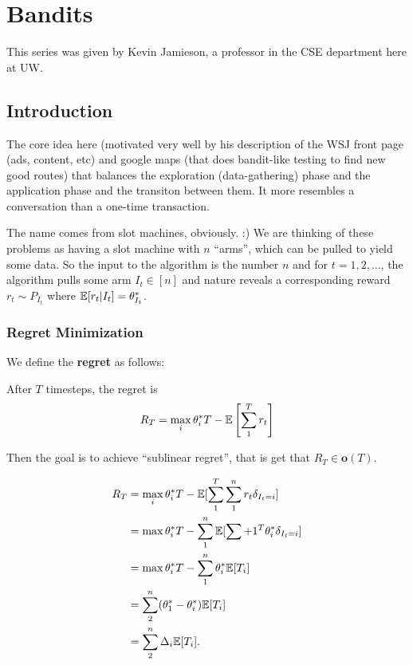 \documentclass[12pt]{article}
\begin{document}
\pagebreak

\section{Bandits}
This series was given by Kevin Jamieson, a professor in the CSE department here at UW.

\subsection{Introduction}
The core idea here (motivated very well by his description of the WSJ front page (ads, content, etc) and google maps (that does bandit-like testing to find new good routes) that balances
the exploration (data-gathering) phase and the application phase and the transiton between them. It more resembles a conversation than a one-time transaction.

The name comes from slot machines, obviously. :) We are thinking of these problems as having a slot machine with $n$ ``arms'', which can be pulled to yield some data.
So the input to the algorithm is the number $n$ and for $t=1,2,\dots$, the algorithm pulls some arm $I_t\in[n]$ and nature reveals a corresponding reward $r_t\sim P_{I_t}$ where 
$\mathbb{E}[r_t|I_t]=\theta_{I_t}^\ast$.

\subsubsection{Regret Minimization}
We define the \textbf{regret} as follows:
\begin{defn}
	After $T$ timesteps, the regret is 
	\[R_T=\max_i\theta_i^\ast T-\mathbb{E}\left[\sum_1^T r_t\right]\]
\end{defn}
Then the goal is to achieve ``sublinear regret'', that is get that $R_T\in\mathbf{o}(T)$.
\begin{lem}
	\begin{align*}
		R_T&=\max_i\theta_i^\ast T-\mathbb{E}[\sum_1^T\sum_1^n r_t\delta_{I_t=i}]\\
		&=\max\theta_i^\ast T - \sum_1^n\mathbb{E}[\sum+1^T\theta_i^\ast\delta_{I_t=i}]\\
		&=\max\theta_i^\ast T-\sum_1^n\theta_i^\ast\mathbb{E}[T_i]\\
		&=\sum_2^n(\theta_1^\ast-\theta_i^\ast)\mathbb{E}[T_i]\\
		&=\sum_2^n\Delta_i\mathbb{E}[T_i].
	\end{align*}
\end{lem}
\end{document}
